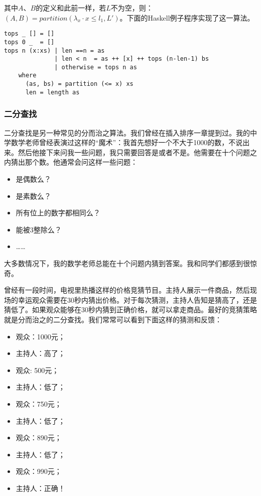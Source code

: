 \documentclass[UTF8]{article}
\begin{document}
其中$A$、$B$的定义和此前一样，若$L$不为空，则：$(A, B) = partition(\lambda_x \cdot x \leq l_1, L')$。下面的Haskell例子程序实现了这一算法。

\lstset{language=Haskell}
\begin{lstlisting}
tops _ [] = []
tops 0 _  = []
tops n (x:xs) | len ==n = as
              | len < n  = as ++ [x] ++ tops (n-len-1) bs
              | otherwise = tops n as
    where
      (as, bs) = partition (<= x) xs
      len = length as
\end{lstlisting}

\subsubsection{二分查找}

二分查找是另一种常见的分而治之算法。我们曾经在插入排序一章提到过。我的中学数学老师曾经表演过这样的“魔术”：我首先想好一个不大于1000的数，不说出来。然后他接下来问我一些问题，我只需要回答是或者不是。他需要在十个问题之内猜出那个数。他通常会问这样一些问题：

\begin{itemize}
\item 是偶数么？
\item 是素数么？
\item 所有位上的数字都相同么？
\item 能被3整除么？
\item ……
\end{itemize}

大多数情况下，我的数学老师总能在十个问题内猜到答案。我和同学们都感到很惊奇。

曾经有一段时间，电视里热播这样的价格竞猜节目。主持人展示一件商品，然后现场的幸运观众需要在30秒内猜出价格。对于每次猜测，主持人告知是猜高了，还是猜低了。如果观众能够在30秒内猜到正确价格，就可以拿走商品。最好的竞猜策略就是分而治之的二分查找。我们常常可以看到下面这样的猜测和反馈：

\begin{itemize}
\item 观众：1000元；
\item 主持人：高了；
\item 观众: 500元；
\item 主持人：低了；
\item 观众：750元；
\item 主持人：低了；
\item 观众：890元；
\item 主持人：低了；
\item 观众：990元；
\item 主持人：正确！
\end{itemize}
\end{document}
